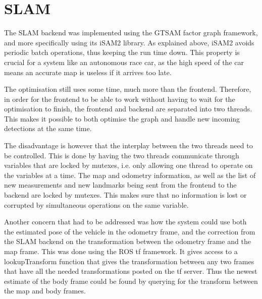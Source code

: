 \section{SLAM}

The SLAM backend was implemented using the GTSAM factor graph framework\cite{GTSAM}, and more specifically using its iSAM2\cite{iSAM2} library. As explained above, iSAM2 avoids periodic batch operations, thus keeping the run time down. This property is crucial for a system like an autonomous race car, as the high speed of the car means an accurate map is useless if it arrives too late. 

The optimisation still uses some time, much more than the frontend. Therefore, in order for the frontend to be able to work without having to wait for the optimisation to finish, the frontend and backend are separated into two threads. This makes it possible to both optimise the graph and handle new incoming detections at the same time. 

The disadvantage is however that the interplay between the two threads need to be controlled. This is done by having the two threads communicate through variables that are locked by mutexes, i.e. only allowing one thread to operate on the variables at a time. The map and odometry information, as well as the list of new measurements and new landmarks being sent from the frontend to the backend are locked by mutexes. This makes sure that no information is lost or corrupted by simultaneous operations on the same variable. 

Another concern that had to be addressed was how the system could use both the estimated pose of the vehicle in the odometry frame, and the correction from the SLAM backend on the transformation between the odometry frame and the map frame. This was done using the \gls{ROS} tf framework. It gives access to a lookupTransform function that gives the transformation between any two frames that have all the needed transformations posted on the tf server. Thus the newest estimate of the body frame could be found by querying for the transform between the map and body frames. 

\iffalse
\subsubsection{BearingRange factor}

The landmark measurements added to the factor graph are added as bearingrange factors, even though they are really measurements of an $x$ and a $y$ position in the body frame. This is because otherwise the factor had to be implemented ourselves, whereas the BearingRange factor comes with GTSAM. How this affects the system is a bit unknown, but it does seem less than ideal, and is probably something that should be fixed, if only there was time.
\todo[inline]{Remove this section?}
\fi
